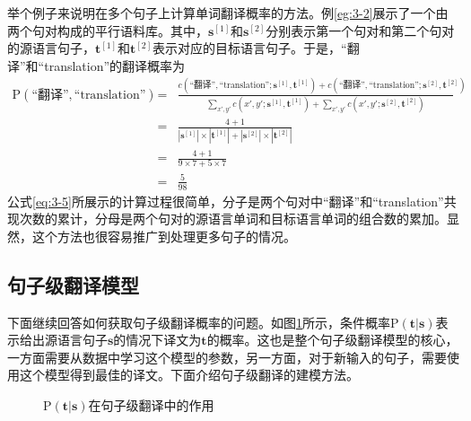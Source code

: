 \parinterval 举个例子来说明在多个句子上计算单词翻译概率的方法。例\ref{eg:3-2}展示了一个由两个句对构成的平行语料库。其中，$\mathbf{s}^{[1]}$和$\mathbf{s}^{[2]}$分别表示第一个句对和第二个句对的源语言句子，$\mathbf{t}^{[1]}$和$\mathbf{t}^{[2]}$表示对应的目标语言句子。于是，``翻译''和``translation''的翻译概率为
{\small
\begin{eqnarray}
{\textrm{P}(\textrm{``翻译''},\textrm{``translation''})} & = & {\frac{c(\textrm{``翻译''},\textrm{``translation''};\mathbf{s}^{[1]},\mathbf{t}^{[1]})+c(\textrm{``翻译''},\textrm{``translation''};\mathbf{s}^{[2]},\mathbf{t}^{[2]})}{\sum_{x',y'} c(x',y';\mathbf{s}^{[1]},\mathbf{t}^{[1]}) + \sum_{x',y'} c(x',y';\mathbf{s}^{[2]},\mathbf{t}^{[2]})}} \nonumber \\
                                                                            & = & \frac{4 + 1}{|\mathbf{s}^{[1]}| \times |\mathbf{t}^{[1]}| + |\mathbf{s}^{[2]}| \times |\mathbf{t}^{[2]}|} \nonumber \\
                                                                            & = & \frac{4 + 1}{9 \times 7 + 5 \times 7} \nonumber \\
                                                                            & = & \frac{5}{98}
\label{eq:3-5}
\end{eqnarray}
}
\parinterval 公式\ref{eq:3-5}所展示的计算过程很简单，分子是两个句对中``翻译''和``translation''共现次数的累计，分母是两个句对的源语言单词和目标语言单词的组合数的累加。显然，这个方法也很容易推广到处理更多句子的情况。


\subsection{句子级翻译模型}
\label{sec:sentence-level-translation}

\parinterval 下面继续回答如何获取句子级翻译概率的问题。如图\ref{fig:3-6}所示，条件概率$\textrm{P}(\mathbf{t}|\mathbf{s})$表示给出源语言句子$\mathbf{s}$的情况下译文为$\mathbf{t}$的概率。这也是整个句子级翻译模型的核心，一方面需要从数据中学习这个模型的参数，另一方面，对于新输入的句子，需要使用这个模型得到最佳的译文。下面介绍句子级翻译的建模方法。

\begin{figure}[htp]
    \centering

    \caption{$\textrm{P}(\mathbf{t}|\mathbf{s})$在句子级翻译中的作用}
    \label{fig:3-6}
\end{figure}


